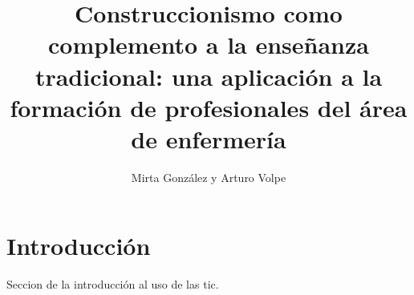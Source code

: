 \documentclass[final,fmstyle]{./util/ucathesis}
\title{Construccionismo como complemento a la enseñanza tradicional:  una
	aplicación a la formación de profesionales del área de enfermería}
\author{Mirta González y Arturo Volpe}
\begin{document}


\maketitle

\tableofcontents

\printglossary[type=\acronymtype,title=Lista de Siglas]



\mainmatter

\chapter{Introducción}

Seccion de la introducción al uso de las \Gls{tic}.





\printbibliography
\end{document}
